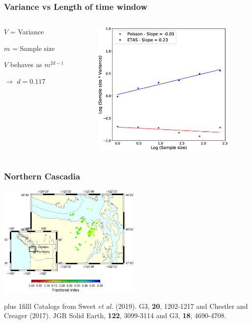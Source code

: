 \documentclass{beamer}
\newcommand{\btVFill}{\vskip0pt plus 1filll}
\begin{document}
	\begin{frame}
		\frametitle{Variance vs Length of time window}
		\begin{columns}[c]
			\begin{column}{4cm}
				$V$ = Variance

				\vspace{1em}

				$m$ = Sample size

				\vspace{1em}

				$V$ behaves as $m^{2 d - 1}$

				\vspace{1em}

				$\rightarrow$ $d =  0.117$
			\end{column}
			\begin{column}{7cm}
				\begin{center}
					\includegraphics[width=7cm, trim={0cm 1cm 2cm 2cm}, clip]{longrange/comparison_2.eps}
				\end{center}
			\end{column}
		\end{columns}
	\end{frame}

	\begin{frame}
		\frametitle{Northern Cascadia}
		\begin{center}
			\includegraphics[width=7cm, trim={1cm 0cm 1cm 14cm}, clip]{longrange/cascadia_d.eps}
		\end{center}
		\btVFill
		\tiny{Catalogs from Sweet \textit{et al.} (2019). G3, \textbf{20}, 1202-1217 and Chestler and Creager (2017). JGR Solid Earth, \textbf{122}, 3099-3114 and G3, \textbf{18}, 4690-4708.}
	\end{frame}
\end{document}
